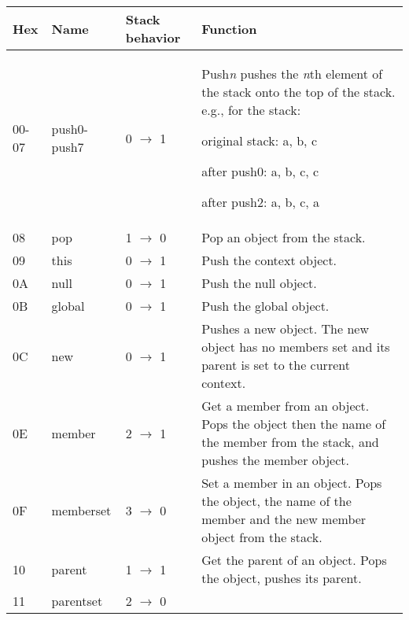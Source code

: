 \begin{longtable}{ | l | l | l | X | }
\hline
\textbf{Hex} & \textbf{Name} & \textbf{Stack behavior} & \textbf{Function} \\
\hline\hline
00-07 & push0-push7 & 0 $\rightarrow$ 1 & Push\textit{n} pushes the \textit{n}th element of the stack onto the top of the stack. e.g., for the stack:

original stack: a, b, c

after push0: a, b, c, c

after push2: a, b, c, a \\
\hline
08 & pop & 1 $\rightarrow$ 0 & Pop an object from the stack. \\
\hline
09 & this & 0 $\rightarrow$ 1 & Push the context object. \\
\hline
0A & null & 0 $\rightarrow$ 1 & Push the null object. \\
\hline
0B & global & 0 $\rightarrow$ 1 & Push the global object. \\
\hline
0C & new & 0 $\rightarrow$ 1 & Pushes a new object. The new object has no members set and its parent is set to the current context. \\
\hline
0E & member & 2 $\rightarrow$ 1 & Get a member from an object. Pops the object then the name of the member from the stack, and pushes the member object. \\
\hline
0F & memberset & 3 $\rightarrow$ 0 & Set a member in an object. Pops the object, the name of the member and the new member object from the stack. \\
\hline
10 & parent & 1 $\rightarrow$ 1 & Get the parent of an object. Pops the object, pushes its parent. \\
\hline
11 & parentset & 

2 $\rightarrow$ 0 & 


\end{longtable}
